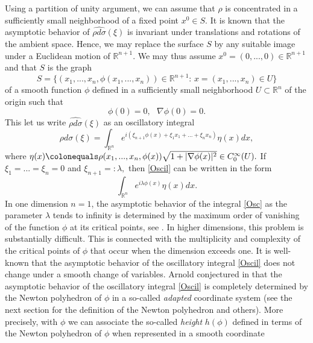 \documentclass[a4paper, 11pt]{article}
\theoremstyle{plain}
\theoremstyle{definition}
\theoremstyle{lemma}
\theoremstyle{Remark}
\theoremstyle{proposition}
\theoremstyle{corollary}
\theoremstyle{example}
\theoremstyle{assumption}
\begin{document}
  Using a partition of unity argument, we can assume that $\rho$ is concentrated in a sufficiently small neighborhood of a fixed point $x^0\in S.$
It is known  that the  asymptotic behavior of $\widehat{\rho d\sigma}(\xi)$ is
invariant under translations and rotations of the ambient space. Hence, we may replace
the surface $S$ by any suitable image under a Euclidean motion of $\mathbb{R}^{n+1}.$ We may thus assume  $x^0=(0,...,0)\in \mathbb{R}^{n+1}$ and that $S$ is the graph
\begin{equation*}
S=\{(x_1,...,x_n, \phi(x_1,...,x_n))\in \mathbb{R}^{n+1}:\,x=(x_1,...,x_n)\in U\}
\end{equation*}
of a smooth function $\phi$ defined in  a sufficiently small neighborhood $U\subset \mathbb{R}^n$ of the origin such that
\begin{equation*}
\phi(0)=0,\,\,\,\,\nabla \phi(0)=0.
\end{equation*}
  This let us write  $\widehat{\rho d\sigma}(\xi)$ as an oscillatory integral
   \begin{equation}\label{Oscil}
 \widehat{\rho d\sigma}(\xi)= \int_{\mathbb{R}^n} e^{i(\xi_{n+1}\phi(x)+\xi_1x_1+...+\xi_nx_n)}\eta(x) dx,
\end{equation}
where
 $
 \eta(x)\colonequals \rho(x_1,...,x_n, \phi (x))\sqrt{1+|\nabla \phi(x)|^2} \in C^{\infty}_0(U).
 $
  If $\xi_1=...=\xi_n=0$ and $ \xi_{n+1}=:\lambda,$ then  \eqref{Oscil}   can be written in the form
\begin{equation}\label{Osc}
\int_{\mathbb{R}^n}e^{i\lambda \phi(x)}\eta (x)dx.
\end{equation}
 In one dimension $n=1$, the asymptotic behavior of the integral \eqref{Osc} as the parameter $\lambda$ tends to infinity is determined by the maximum order of vanishing of the function $\phi$ at its critical points, see \cite{Stein}.
In higher dimensions, this problem  is substantially difficult. This is connected with the multiplicity and complexity of the critical points of $\phi$ that occur when the dimension exceeds one. It is well-known that  the asymptotic behavior of the oscillatory integral \eqref{Oscil} does not change under a smooth change of variables.   Arnold conjectured in \cite{Ar} that  the asymptotic behavior of the oscillatory integral \eqref{Oscil} is completely determined by the Newton polyhedron of  $\phi$ in a so-called \emph{adapted} coordinate system (see the next section for the definition of the Newton polyhedron and others). More precisely, with $\phi$
we can associate  the so-called \emph{height} $h(\phi)$
defined in terms of the Newton polyhedron of $\phi$  when represented in  a smooth coordinate
\end{document}
